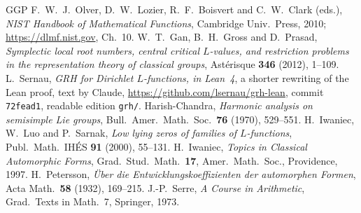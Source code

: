 \documentclass[reqno]{amsart}
\theoremstyle{definition}
\theoremstyle{plain}
\begin{document}
\begin{thebibliography}{GGP}
 F.~W.~J.~Olver, D.~W.~Lozier, R.~F.~Boisvert and C.~W.~Clark (eds.), \emph{NIST Handbook of Mathematical Functions}, Cambridge Univ.\ Press, 2010; \url{https://dlmf.nist.gov}, Ch.~10.
 W.~T.~Gan, B.~H.~Gross and D.~Prasad, \emph{Symplectic local root numbers, central critical \(L\)-values, and restriction problems in the representation theory of classical groups}, Ast\'erisque \textbf{346} (2012), 1--109.
 L.~Sernau, \emph{GRH for Dirichlet \(L\)-functions, in Lean~4}, a shorter rewriting of the Lean proof, text by Claude, \url{https://github.com/lsernau/grh-lean}, commit \texttt{72fead1}, readable edition \texttt{grh/}.
 Harish-Chandra, \emph{Harmonic analysis on semisimple Lie groups}, Bull.\ Amer.\ Math.\ Soc.\ \textbf{76} (1970), 529--551.
 H.~Iwaniec, W.~Luo and P.~Sarnak, \emph{Low lying zeros of families of \(L\)-functions}, Publ.\ Math.\ IH\'ES \textbf{91} (2000), 55--131.
 H.~Iwaniec, \emph{Topics in Classical Automorphic Forms}, Grad.\ Stud.\ Math.\ \textbf{17}, Amer.\ Math.\ Soc., Providence, 1997.
 H.~Petersson, \emph{\"Uber die Entwicklungskoeffizienten der automorphen Formen}, Acta Math.\ \textbf{58} (1932), 169--215.
 J.-P.~Serre, \emph{A Course in Arithmetic}, Grad.\ Texts in Math.\ 7, Springer, 1973.
\end{thebibliography}
\end{document}
